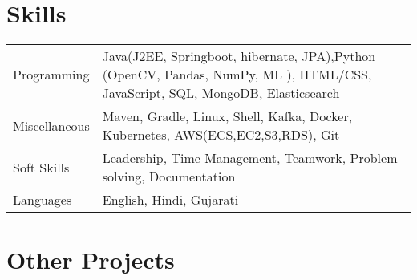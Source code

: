 \documentclass[a4paper,12pt]{article}
\begin{document}

\section{Skills}
\begin{tabularx}{\linewidth}{@{}l X@{}}
Programming & Java(J2EE, Springboot, hibernate, JPA),Python (OpenCV, Pandas, NumPy, ML%
), HTML/CSS, JavaScript, SQL, MongoDB, Elasticsearch \\
Miscellaneous & Maven, Gradle, Linux, Shell, Kafka, Docker, Kubernetes, AWS(ECS,EC2,S3,RDS), Git \\
Soft Skills & Leadership, Time Management, Teamwork, Problem-solving, Documentation \\
Languages & English, Hindi, Gujarati
\end{tabularx}

\section{Other Projects}
\end{document}
